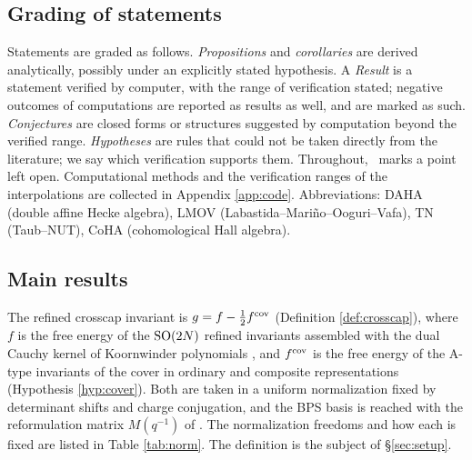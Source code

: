 \subsection{Grading of statements}\label{sec:grading}
Statements are graded as follows. \emph{Propositions} and \emph{corollaries} are derived analytically, possibly under an explicitly stated hypothesis. A \emph{Result} is a statement verified by computer, with the range of verification stated; negative outcomes of computations are reported as results as well, and are marked as such. \emph{Conjectures} are closed forms or structures suggested by computation beyond the verified range. \emph{Hypotheses} are rules that could not be taken directly from the literature; we say which verification supports them. Throughout, \open\ marks a point left open. Computational methods and the verification ranges of the interpolations are collected in Appendix \ref{app:code}. Abbreviations: DAHA (double affine Hecke algebra), LMOV (Labastida--Mari\~no--Ooguri--Vafa), TN (Taub--NUT), CoHA (cohomological Hall algebra).

\subsection{Main results}
The refined crosscap invariant is $g = f - \tfrac12 f^{\mathrm{cov}}$ (Definition \ref{def:crosscap}), where $f$ is the free energy of the $\mathrm{SO}(2N)$ refined invariants assembled with the dual Cauchy kernel of Koornwinder polynomials \cite{Mimachi01}, and $f^{\mathrm{cov}}$ is the free energy of the A-type invariants of the cover in ordinary and composite representations (Hypothesis \ref{hyp:cover}). Both are taken in a uniform normalization fixed by determinant shifts and charge conjugation, and the BPS basis is reached with the reformulation matrix $M(q^{-1})$ of \cite{Marino09}. The normalization freedoms and how each is fixed are listed in Table \ref{tab:norm}. The definition is the subject of \S\ref{sec:setup}.

